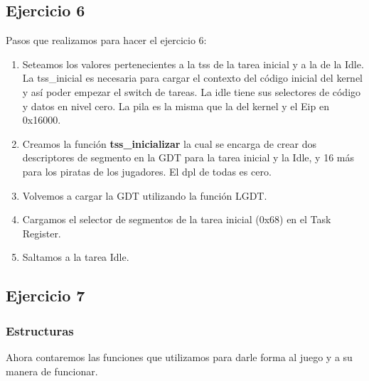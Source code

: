 \documentclass[a4paper,10pt]{article}
\begin{document}
\subsection{Ejercicio 6}
Pasos que realizamos para hacer el ejercicio 6:
\begin{enumerate}
  \item Seteamos los valores pertenecientes a la tss de la tarea inicial y a la de la Idle. La tss\_inicial es necesaria
    para cargar el contexto del código inicial del kernel y así poder empezar el switch de tareas. 
    La idle tiene sus selectores de código y datos en nivel cero. La pila es la misma que la del kernel y el Eip en 0x16000.
  \item Creamos la función \textbf{tss\_inicializar} la cual se encarga de crear dos descriptores de segmento en la GDT para la tarea
    inicial y la Idle, y 16 más para los piratas de los jugadores. El dpl de todas es cero.
  \item Volvemos a cargar la GDT utilizando la función LGDT.
  \item Cargamos el selector de segmentos de la tarea inicial (0x68) en el Task Register.
  \item Saltamos a la tarea Idle.
\end{enumerate}

\subsection{Ejercicio 7}
\subsubsection{Estructuras}
Ahora contaremos las funciones que utilizamos para darle forma al juego y a su manera de funcionar.
\end{document}
